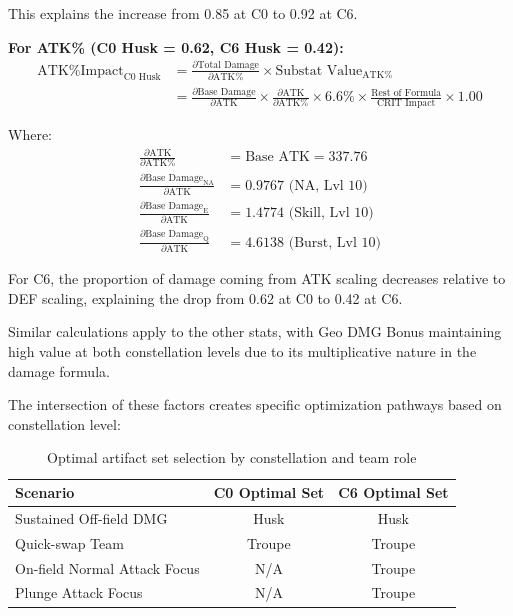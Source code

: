 \documentclass[12pt,a4paper]{article}
\begin{document}
This explains the increase from 0.85 at C0 to 0.92 at C6.

\textbf{For ATK\% (C0 Husk = 0.62, C6 Husk = 0.42):}
\begin{align}
\text{ATK\% Impact}_{\text{C0 Husk}} &= \frac{\partial \text{Total Damage}}{\partial \text{ATK\%}} \times \text{Substat Value}_{\text{ATK\%}} \\
&= \frac{\partial \text{Base Damage}}{\partial \text{ATK}} \times \frac{\partial \text{ATK}}{\partial \text{ATK\%}} \times 6.6\% \times \frac{\text{Rest of Formula}}{\text{CRIT Impact}} \times 1.00
\end{align}

Where:
\begin{align}
\frac{\partial \text{ATK}}{\partial \text{ATK\%}} &= \text{Base ATK} = 337.76 \\
\frac{\partial \text{Base Damage}_{\text{NA}}}{\partial \text{ATK}} &= 0.9767 \text{ (NA, Lvl 10)} \\
\frac{\partial \text{Base Damage}_{\text{E}}}{\partial \text{ATK}} &= 1.4774 \text{ (Skill, Lvl 10)} \\
\frac{\partial \text{Base Damage}_{\text{Q}}}{\partial \text{ATK}} &= 4.6138 \text{ (Burst, Lvl 10)}
\end{align}

For C6, the proportion of damage coming from ATK scaling decreases relative to DEF scaling, explaining the drop from 0.62 at C0 to 0.42 at C6.

Similar calculations apply to the other stats, with Geo DMG Bonus maintaining high value at both constellation levels due to its multiplicative nature in the damage formula.

The intersection of these factors creates specific optimization pathways based on constellation level:

\begin{table}[h]
\centering
\begin{tabular}{lcc}
\toprule
\textbf{Scenario} & \textbf{C0 Optimal Set} & \textbf{C6 Optimal Set} \\
\midrule
Sustained Off-field DMG & Husk & Husk \\
Quick-swap Team & Troupe & Troupe \\
On-field Normal Attack Focus & N/A & Troupe \\
Plunge Attack Focus & N/A & Troupe \\
\bottomrule
\end{tabular}
\caption{Optimal artifact set selection by constellation and team role}
\label{tab:artifact_selection}
\end{table}
\end{document}
